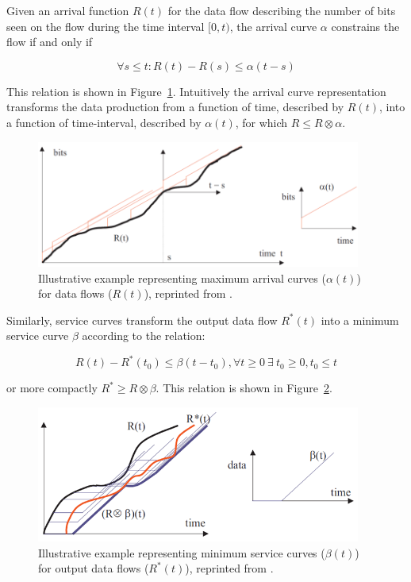 Given an arrival function $R(t)$ for the data flow describing the
number of bits seen on the flow during the time interval $[0,t)$, the
arrival curve $\alpha$ constrains the flow if and only if

\begin{equation}
  \forall s\leq t : R(t) -R(s) \leq \alpha(t-s)
\end{equation}

This relation is shown in Figure~\ref{fig:nc_arrival_curve}.
Intuitively the arrival curve representation transforms the data
production from a function of time, described by $R(t)$, into a
function of time-interval, described by $\alpha(t)$, for which $R\leq
R \otimes \alpha$.

\begin{figure}[htb]
  \centering
  \includegraphics[width=0.95\textwidth]{figs/nc_arrival_curve.png}
  \caption{Illustrative example representing maximum arrival curves
    ($\alpha(t)$) for data flows ($R(t)$), reprinted from
    \cite{NCBook}.}
  \label{fig:nc_arrival_curve}
\end{figure}

Similarly, service curves transform the output data flow $R^*(t)$
into a minimum service curve $\beta$ according to the relation:

\begin{equation}
  R(t)-R^*(t_0)\leq \beta(t-t_0), \forall t\geq 0\ \exists\ t_0\geq
  0,t_0\leq t
\end{equation}

or more compactly $R^*\geq R\otimes\beta$.  This relation is shown in
Figure~\ref{fig:nc_service_curve}.

\begin{figure}[htb]
  \centering
  \includegraphics[width=0.95\textwidth]{figs/nc_service_curve.png}
  \caption{Illustrative example representing minimum service curves
    ($\beta(t)$) for output data flows ($R^*(t)$), reprinted from
    \cite{NCBook}.}
  \label{fig:nc_service_curve}
\end{figure}

